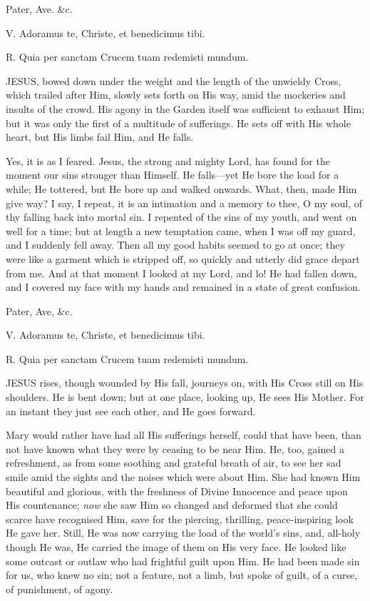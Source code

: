 Pater, Ave. \&c.


V. Adoramus te, Christe, et
benedicimus tibi.

R. Quia per sanctam Crucem tuam redemisti mundum.

JESUS, bowed down
under the weight and the length of the unwieldy Cross, which trailed
after Him, slowly sets forth on His way, amid the mockeries and insults
of the crowd. His agony in the Garden itself was sufficient to exhaust
Him; but it was only the first of a multitude of sufferings. He sets off
with His whole heart, but His limbs fail Him, and He falls.

Yes, it is as I feared. Jesus,
the strong and mighty Lord, has found for the moment our sins stronger
than Himself. He falls—yet He bore the load for a while; He tottered,
but He bore up and walked onwards. What, then, made Him give way? I say,
I repeat, it is an intimation and a memory to thee, O my soul, of thy
falling back into mortal sin. I repented of the sins of my youth, and
went on well for a time; but at length a new temptation came, when I was
off my guard, and I suddenly fell away. Then all my good habits seemed
to go at once; they were like a garment which is stripped off, so
quickly and utterly did grace depart from me. And at that moment I
looked at my Lord, and lo! He had fallen down, and I covered my face
with my hands and remained in a state of great confusion.

Pater, Ave, \&c.


V. Adoramus te, Christe, et
benedicimus tibi.

R. Quia per sanctam Crucem tuam redemisti mundum.

JESUS rises, though
wounded by His fall, journeys on, with His Cross still on His shoulders.
He is bent down; but at one place, looking up, He sees His Mother. For
an instant they just see each other, and He goes forward.

Mary would rather have had all
His sufferings herself, could that have been, than not have known what
they were by ceasing to be near Him. He, too, gained a refreshment, as
from some soothing and grateful breath of air, to see her sad smile amid
the sights and the noises which were about Him. She had known Him
beautiful and glorious, with the freshness of Divine Innocence and peace
upon His countenance; \emph{now} she saw Him so changed and deformed
that she could scarce have recognised Him, save for the piercing,
thrilling, peace-inspiring look He gave her. Still, He was now carrying
the load of the world's sins, and, all-holy though He was, He carried
the image of them on His very face. He looked like some outcast or
outlaw who had frightful guilt upon Him. He had been made sin for us,
who knew no sin; not a feature, not a limb, but spoke of guilt, of a
curse, of punishment, of agony.

